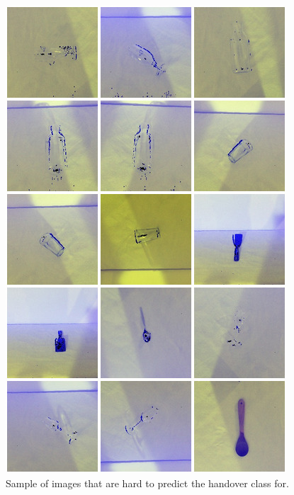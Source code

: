 \begin{figure}
	\centering
	\includegraphics[width=\textwidth]{img/results/bad-images.jpg}
	\caption{Sample of images that are hard to predict the handover class for.}
	\label{fig:results_bad-images}
\end{figure}

